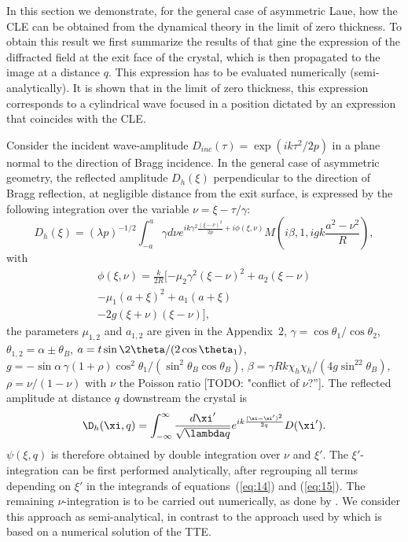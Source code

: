 \documentclass[preprint]{iucr}              %
\newcommand{\todo}[1]{{\color{red}[TODO: "#1'']}}
\newcommand{\inblue}[1]{{\color{blue}#1}}
\begin{document}
\inblue{In this section we demonstrate, for the general case of asymmetric Laue, how the CLE can be obtained from the dynamical theory in the limit of zero thickness. To obtain this result we first summarize the results of \cite{GuigayFerrero2016} that gine the expression of the diffracted field at the exit face of the crystal, which is then propagated to the image at a distance $q$. This expression has to be evaluated numerically (semi-analytically). It is shown that in the limit of zero thickness, this expression corresponds to a cylindrical wave focused in a position dictated by an expression that coincides with the CLE.}

Consider the incident  wave-amplitude $D_{inc}(\tau)=\exp(i k \tau^2/ 2 p)$ in a plane normal to the direction of Bragg incidence. In the general case of asymmetric geometry, the reflected amplitude $D_h(\xi)$ perpendicular to the direction of Bragg reflection, at negligible distance from the exit surface, is expressed by the following integration over the variable $\nu = \xi - \tau / \gamma$:
\begin{equation}
\label{eq:14}
    D_h(\xi) = (\lambda p)^{-1/2} \int_{-a}^{a}\gamma d\nu e^{i k \gamma^2\frac{(\xi-\nu)^2}{2 p} + 
    i \phi(\xi,\nu)} M(i\beta,1, i g k\frac{a^2-\nu^2}{R}),
\end{equation}
with
\begin{multline}
    \phi(\xi,\nu) =\frac{k}{2R}[-\mu_2\gamma^2(\xi-\nu)^2
    +a_2(\xi-\nu) \\
    -\mu_1(a+\xi)^2 
    +a_1(a+\xi) \\
    -2g(\xi+\nu)(\xi-\nu)],
\end{multline}
the parameters $\mu_{1,2}$ and $a_{1,2}$ are given in the Appendix~2, $\gamma=\cos\theta_1/\cos\theta_2$, $\theta_{1,2}=\alpha\pm\theta_B$, $a=t\sin\2\theta/(2\cos\theta_1)$, $g=-\sin\alpha \, \gamma (1+\rho)\cos^2\theta_1/(\sin^2\theta_B\cos\theta_B)$, $\beta=\gamma R k \chi_h\chi_{\bar h}/(4g\sin^22\theta_B)$, $\rho=\nu/(1-\nu)$ with $\nu$ the Poisson ratio \todo{conflict of $\nu$?}.   
The reflected amplitude at distance $q$ downstream the crystal is
\begin{equation}
\label{eq:15}
    \D_h(\xi,q) = \int_{-\infty}^{\infty}\frac{d\xi'}{\sqrt{\lambda q}}e^{i k \frac{(\xi-\xi')^2}{2q}}D(\xi').
\end{equation}
$\psi(\xi,q)$ is therefore obtained by double integration over $\nu$ and $\xi'$. The $\xi'$-integration can be first performed analytically, after regrouping all terms depending on $\xi'$ in the integrands of equations~(\ref{eq:14}) and (\ref{eq:15}). The remaining $\nu$-integration is to be carried out numerically, as done by \cite{GuigayFerrero2016}. We consider this approach as semi-analytical, in contrast to the approach used by \cite{Nesterets} which is based on a numerical solution of the TTE.
\end{document}
